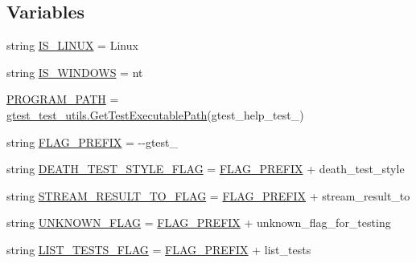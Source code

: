 \subsection*{Variables}
\begin{DoxyCompactItemize}
\item 
string \mbox{\hyperlink{namespacegtest__help__test_ae61a149d50be253176a139fbe6712582}{I\+S\+\_\+\+L\+I\+N\+UX}} = \textquotesingle{}Linux\textquotesingle{}
\item 
string \mbox{\hyperlink{namespacegtest__help__test_a0f8d4b00fc83b1e72bbb5eca5f3bc4d7}{I\+S\+\_\+\+W\+I\+N\+D\+O\+WS}} = \textquotesingle{}nt\textquotesingle{}
\item 
\mbox{\hyperlink{namespacegtest__help__test_a52878eacdd3a1534fa4743e7d134066c}{P\+R\+O\+G\+R\+A\+M\+\_\+\+P\+A\+TH}} = \mbox{\hyperlink{namespacegtest__test__utils_a89ed3717984a80ffbb7a9c92f71b86a2}{gtest\+\_\+test\+\_\+utils.\+Get\+Test\+Executable\+Path}}(\textquotesingle{}gtest\+\_\+help\+\_\+test\+\_\+\textquotesingle{})
\item 
string \mbox{\hyperlink{namespacegtest__help__test_a9e357a76dd993057c826ec411c9a4b3c}{F\+L\+A\+G\+\_\+\+P\+R\+E\+F\+IX}} = \textquotesingle{}-\/-\/gtest\+\_\+\textquotesingle{}
\item 
string \mbox{\hyperlink{namespacegtest__help__test_a322bbb8bf27d7701c76fb5704a1fda1f}{D\+E\+A\+T\+H\+\_\+\+T\+E\+S\+T\+\_\+\+S\+T\+Y\+L\+E\+\_\+\+F\+L\+AG}} = \mbox{\hyperlink{namespacegtest__help__test_a9e357a76dd993057c826ec411c9a4b3c}{F\+L\+A\+G\+\_\+\+P\+R\+E\+F\+IX}} + \textquotesingle{}death\+\_\+test\+\_\+style\textquotesingle{}
\item 
string \mbox{\hyperlink{namespacegtest__help__test_a06d67cce3cb57c484c169d1dbe4afd6c}{S\+T\+R\+E\+A\+M\+\_\+\+R\+E\+S\+U\+L\+T\+\_\+\+T\+O\+\_\+\+F\+L\+AG}} = \mbox{\hyperlink{namespacegtest__help__test_a9e357a76dd993057c826ec411c9a4b3c}{F\+L\+A\+G\+\_\+\+P\+R\+E\+F\+IX}} + \textquotesingle{}stream\+\_\+result\+\_\+to\textquotesingle{}
\item 
string \mbox{\hyperlink{namespacegtest__help__test_a400934cf13530098af31e2a65f1a8d84}{U\+N\+K\+N\+O\+W\+N\+\_\+\+F\+L\+AG}} = \mbox{\hyperlink{namespacegtest__help__test_a9e357a76dd993057c826ec411c9a4b3c}{F\+L\+A\+G\+\_\+\+P\+R\+E\+F\+IX}} + \textquotesingle{}unknown\+\_\+flag\+\_\+for\+\_\+testing\textquotesingle{}
\item 
string \mbox{\hyperlink{namespacegtest__help__test_a558dea5edfd6fdb48112401b257f5aea}{L\+I\+S\+T\+\_\+\+T\+E\+S\+T\+S\+\_\+\+F\+L\+AG}} = \mbox{\hyperlink{namespacegtest__help__test_a9e357a76dd993057c826ec411c9a4b3c}{F\+L\+A\+G\+\_\+\+P\+R\+E\+F\+IX}} + \textquotesingle{}list\+\_\+tests\textquotesingle{}

\end{DoxyCompactItemize}
